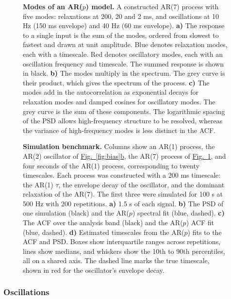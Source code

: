 \documentclass[pdflatex,lineno,sn-nature]{sn-jnl}
\newcommand{\figpanel}[3][]{\hyperref[#2]{Fig.~#1\ref*{#2}#3}}
\theoremstyle{thmstyleone}
\theoremstyle{thmstyletwo}
\theoremstyle{thmstylethree}
\begin{document}
\begin{figure}[htbp]
\centering

\caption{\textbf{Modes of an AR($p$) model.} A constructed AR(7) process with five modes: relaxations at 200, 20 and 2 ms, and oscillations at 10 Hz (150 ms envelope) and 40 Hz (60 ms envelope). \textbf{a)} The response to a single input is the sum of the modes, ordered from slowest to fastest and drawn at unit amplitude. Blue denotes relaxation modes, each with a timescale. Red denotes oscillatory modes, each with an oscillation frequency and timescale. The summed response is shown in black. \textbf{b)} The modes multiply in the spectrum. The grey curve is their product, which gives the spectrum of the process. \textbf{c)} The modes add in the autocorrelation as exponential decays for relaxation modes and damped cosines for oscillatory modes. The grey curve is the sum of these components. The logarithmic spacing of the PSD allows high-frequency structure to be resolved, whereas the variance of high-frequency modes is less distinct in the ACF.}
\label{fig:modes}
\end{figure}

\begin{figure}[htbp]
\centering

\caption{\textbf{Simulation benchmark.} Columns show an AR(1) process, the AR(2) oscillator of \figpanel{fig:bias}{b}, the AR(7) process of \figpanel{fig:modes}{}, and four seconds of the AR(1) process, corresponding to twenty timescales. Each process was constructed with a 200 ms timescale: the AR(1) $\tau$, the envelope decay of the oscillator, and the dominant relaxation of the AR(7). The first three were simulated for 100 s at 500 Hz with 200 repetitions. \textbf{a)} 1.5 s of each signal. \textbf{b)} The PSD of one simulation (black) and the AR($p$) spectral fit (blue, dashed). \textbf{c)} The ACF over the analysis band (black) and the AR($p$) ACF fit (blue, dashed). \textbf{d)} Estimated timescales from the AR($p$) fits to the ACF and PSD. Boxes show interquartile ranges across repetitions, lines show medians, and whiskers show the 10th to 90th percentiles, all on a shared axis. The dashed line marks the true timescale, shown in red for the oscillator's envelope decay.}
\label{fig:benchmark}
\end{figure}

\subsubsection{Oscillations}\label{sec:osc}
\end{document}
